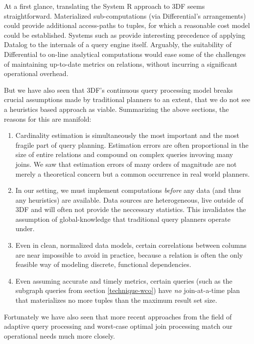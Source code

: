 \documentclass[../index.tex]{subfiles}
\begin{document}
At a first glance, translating the System R approach to 3DF seems
straightforward. Materialized sub-computations (via Differential's
arrangements) could provide additional access-paths to tuples, for
which a reasonable cost model could be established. Systems such as
\cite{condie2008evita} provide interesting precedence of applying
Datalog to the internals of a query engine itself. Arguably, the
suitability of Differential to on-line analytical computations would
ease some of the challenges of maintaining up-to-date metrics on
relations, without incurring a significant operational overhead.

But we have also seen that 3DF's continuous query processing model
breaks crucial assumptions made by traditional planners to an extent,
that we do not see a heuristics based approach as viable. Summarizing
the above sections, the reasons for this are manifold:

\begin{enumerate}
  \item
    Cardinality estimation is simultaneously the most important and
    the most fragile part of query planning. Estimation errors are
    often proportional in the size of entire relations and compound on
    complex queries invoving many joins. We saw that estimation errors
    of many orders of magnitude are not merely a theoretical concern
    but a common occurrence in real world planners.

  \item
    In our setting, we must implement computations \emph{before} any
    data (and thus any heuristics) are available. Data sources are
    heterogeneous, live outside of 3DF and will often not provide the
    neccessary statistics. This invalidates the assumption of
    global-knowledge that traditional query planners operate under.

  \item
    Even in clean, normalized data models, certain correlations
    between columns are near impossible to avoid in practice, because
    a relation is often the only feasible way of modeling discrete,
    functional dependencies.

  \item
    Even assuming accurate and timely metrics, certain queries (such
    as the subgraph queries from section \ref{technique-wco}) have
    \emph{no} join-at-a-time plan that materializes no more tuples
    than the maximum result set size.
\end{enumerate}

Fortunately we have also seen that more recent approaches from the
field of adaptive query processing and worst-case optimal join
processing match our operational needs much more closely.
\end{document}
